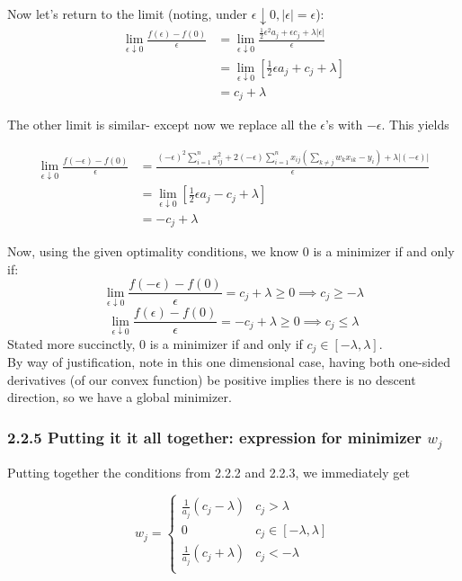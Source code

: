 \documentclass[paper=a4, fontsize=11pt]{scrartcl} %
\numberwithin{equation}{section} %
\numberwithin{figure}{section} %
\numberwithin{table}{section} %
\begin{document}
Now let's return to the limit (noting, under $\epsilon \downarrow 0, |\epsilon| = \epsilon$):
\begin{align*}
\lim_{\epsilon \downarrow 0} \frac{f(\epsilon) - f(0)}{\epsilon} &= \lim_{\epsilon \downarrow 0} \frac{\frac{1}{2}\epsilon^2 a_j + \epsilon c_j + \lambda |\epsilon|}{\epsilon} \\
&= \lim_{\epsilon \downarrow 0} \left[ \frac{1}{2}\epsilon a_j + c_j + \lambda \right] \\
&= c_j + \lambda 
\end{align*}

The other limit is similar- except now we replace all the $\epsilon$'s with $-\epsilon$. This yields

\begin{align*}
\lim_{\epsilon \downarrow 0} \frac{f(-\epsilon) - f(0)}{\epsilon} &= \frac{ (-\epsilon)^2  \sum_{i = 1}^n x_{ij}^2 + 2(-\epsilon) \sum_{i = 1}^n x_{ij} \left(\sum_{k \ne j} w_k x_{ik} - y_i\right) + \lambda |(-\epsilon)| } {\epsilon} \\
&= \lim_{\epsilon \downarrow 0} \left[ \frac{1}{2}\epsilon a_j - c_j + \lambda \right] \\
&=  -c_j + \lambda 
\end{align*}

Now, using the given optimality conditions, we know 0 is a minimizer if and only if:
\[ \lim_{\epsilon \downarrow 0} \frac{f(-\epsilon) - f(0)}{\epsilon} = c_j + \lambda \geq 0 \implies c_j \geq - \lambda\]
\[\lim_{\epsilon \downarrow 0} \frac{f(\epsilon) - f(0)}{\epsilon}  = -c_j + \lambda \geq 0 \implies c_j \leq \lambda\]
Stated more succinctly, 0 is a minimizer if and only if $c_j \in [-\lambda, \lambda]$. \\

By way of justification, note in this one dimensional case, having both one-sided derivatives (of our convex function) be positive implies there is no descent direction, so we have a global minimizer.

\subsubsection*{2.2.5 Putting it it all together: expression for minimizer $w_j$}

Putting together the conditions from 2.2.2 and 2.2.3, we immediately get

\[
w_j = 
\begin{cases}
	\frac{1}{a_j}(c_j - \lambda) & c_j > \lambda \\
	0 & c_j \in [-\lambda, \lambda] \\
	\frac{1}{a_j}(c_j + \lambda) & c_j < - \lambda \\
\end{cases}
\]
\end{document}
